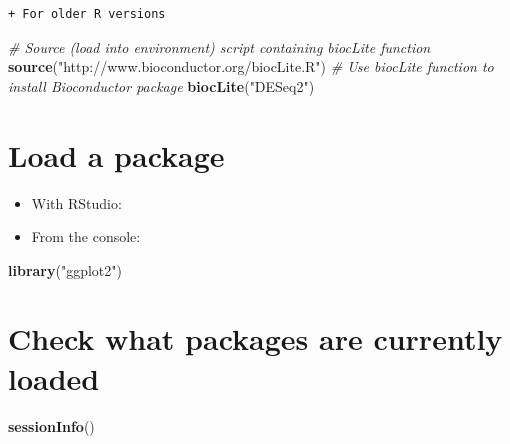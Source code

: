 \documentclass[]{book}
\newenvironment{Shaded}{\begin{snugshade}}{\end{snugshade}}
\newcommand{\CommentTok}[1]{\textcolor[rgb]{0.56,0.35,0.01}{\textit{#1}}}
\newcommand{\KeywordTok}[1]{\textcolor[rgb]{0.13,0.29,0.53}{\textbf{#1}}}
\newcommand{\NormalTok}[1]{#1}
\newcommand{\StringTok}[1]{\textcolor[rgb]{0.31,0.60,0.02}{#1}}
\begin{document}
\begin{verbatim}
+ For older R versions
\end{verbatim}

\begin{Shaded}
\begin{Highlighting}[]
\CommentTok{# Source (load into environment) script containing biocLite function}
\KeywordTok{source}\NormalTok{(}\StringTok{"http://www.bioconductor.org/biocLite.R"}\NormalTok{)}
\CommentTok{# Use biocLite function to install Bioconductor package}
\KeywordTok{biocLite}\NormalTok{(}\StringTok{"DESeq2"}\NormalTok{)}
\end{Highlighting}
\end{Shaded}

\hypertarget{load-a-package}{%
\section{Load a package}\label{load-a-package}}

\begin{itemize}
\item
  With RStudio:
\item
  From the console:
\end{itemize}

\begin{Shaded}
\begin{Highlighting}[]
\KeywordTok{library}\NormalTok{(}\StringTok{"ggplot2"}\NormalTok{)}
\end{Highlighting}
\end{Shaded}

\hypertarget{check-what-packages-are-currently-loaded}{%
\section{Check what packages are currently loaded}\label{check-what-packages-are-currently-loaded}}

\begin{Shaded}
\begin{Highlighting}[]
\KeywordTok{sessionInfo}\NormalTok{()}
\end{Highlighting}
\end{Shaded}
\end{document}
